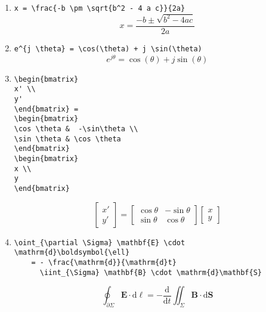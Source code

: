 \begin{enumerate}
\item \verb|x = \frac{-b \pm \sqrt{b^2 - 4 a c}}{2a}|
    \[x = \frac{-b \pm \sqrt{b^2 - 4 a c}}{2a} \]

\item \verb|e^{j \theta} = \cos(\theta) + j \sin(\theta)|
    \[e^{j \theta} = \cos(\theta) + j \sin(\theta)\]

\item
\begin{verbatim}
\begin{bmatrix}
x' \\
y'
\end{bmatrix} =
\begin{bmatrix}
\cos \theta &  -\sin\theta \\
\sin \theta & \cos \theta
\end{bmatrix}
\begin{bmatrix}
x \\
y
\end{bmatrix}
\end{verbatim}
\[
\begin{bmatrix}
x' \\
y'
\end{bmatrix} =
\begin{bmatrix}
\cos \theta &  -\sin\theta \\
\sin \theta & \cos \theta
\end{bmatrix}
\begin{bmatrix}
x \\
y
\end{bmatrix}
\]

\item
\begin{verbatim}
\oint_{\partial \Sigma} \mathbf{E} \cdot \mathrm{d}\boldsymbol{\ell}
    = - \frac{\mathrm{d}}{\mathrm{d}t}
      \iint_{\Sigma} \mathbf{B} \cdot \mathrm{d}\mathbf{S}
\end{verbatim}
    \[\oint_{\partial \Sigma} \mathbf{E} \cdot \mathrm{d}\boldsymbol{\ell}  = - \frac{\mathrm{d}}{\mathrm{d}t} \iint_{\Sigma} \mathbf{B} \cdot \mathrm{d}\mathbf{S}\]
\end{enumerate}
